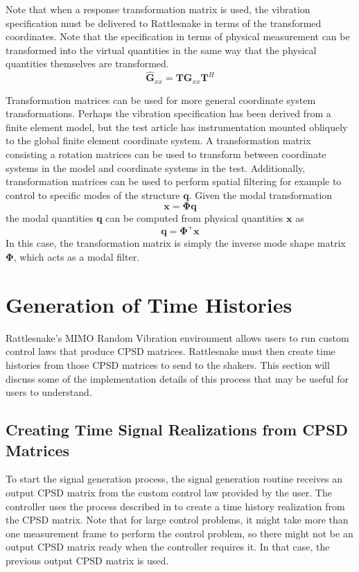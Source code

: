 \documentclass[pdf,12pt,report]{SANDreport}
\begin{document}
    Note that when a response transformation matrix is used, the vibration specification must be delivered to Rattlesnake in terms of the transformed coordinates.  Note that the specification in terms of physical measurement can be transformed into the virtual quantities in the same way that the physical quantities themselves are transformed.
    \begin{equation}
        \hat{\mathbf{G}}_{xx} = \mathbf{T}\mathbf{G}_{xx}\mathbf{T}^H
    \end{equation}

    Transformation matrices can be used for more general coordinate system transformations.  Perhaps the vibration specification has been derived from a finite element model, but the test article has instrumentation mounted obliquely to the global finite element coordinate system.  A transformation matrix consisting a rotation matrices can be used to transform between coordinate systems in the model and coordinate systems in the test.  Additionally, transformation matrices can be used to perform spatial filtering for example to control to specific modes of the structure $\mathbf{q}$.  Given the modal transformation
    \begin{equation}
        \mathbf{x} = \mathbf{\Phi}\mathbf{q}
    \end{equation}
    the modal quantities $\mathbf{q}$ can be computed from physical quantities $\mathbf{x}$ as 
    \begin{equation}
        \mathbf{q} = \mathbf{\Phi}^+\mathbf{x}
    \end{equation}
    In this case, the transformation matrix is simply the inverse mode shape matrix $\mathbf{\Phi}$, which acts as a modal filter.

    \section{Generation of Time Histories}\label{sec:rattlesnake_environments_generating_time_histories}
    Rattlesnake's \Ac{MIMO} Random Vibration environment allows users to run custom control laws that produce \ac{CPSD} matrices.  Rattlesnake must then create time histories from those \ac{CPSD} matrices to send to the shakers.  This section will discuss some of the implementation details of this process that may be useful for users to understand.
    
    \subsection{Creating Time Signal Realizations from \ac{CPSD} Matrices}
    To start the signal generation process, the signal generation routine receives an output \ac{CPSD} matrix from the custom control law provided by the user.  The controller uses the process described in \cite{schultz2020_input_signal_synthesis_openloop_multipleinput_multipleoutput_testing} to create a time history realization from the \ac{CPSD} matrix.  Note that for large control problems, it might take more than one measurement frame to perform the control problem, so there might not be an output \ac{CPSD} matrix ready when the controller requires it.  In that case, the previous output \ac{CPSD} matrix is used.
    
\end{document}
